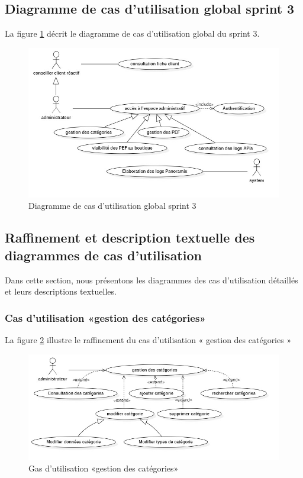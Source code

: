 \subsection{Diagramme de cas d’utilisation global sprint 3}
La figure \ref{fig:usecase-sprint3} décrit le diagramme de cas d’utilisation global du sprint 3.
\begin{figure}[H]
	\centering
	\includegraphics[width=0.58\linewidth]{"img/conception/usecases/sprint 3/UseCase-sprint3"}
	\caption[Diagramme de cas d’utilisation global sprint 3]{Diagramme de cas d’utilisation global sprint 3}
	\label{fig:usecase-sprint3}
\end{figure}

\subsection{Raffinement et description textuelle des diagrammes de cas d’utilisation}
Dans cette section, nous présentons les diagrammes des cas d’utilisation détaillés et leurs descriptions textuelles.
\subsubsection{Cas d’utilisation «gestion des catégories»}
La figure \ref{fig:usecase-gestion-categories} illustre le raffinement du cas d’utilisation « gestion des catégories »

\begin{figure}[H]
	\centering
	\includegraphics[width=0.7\linewidth]{"img/conception/usecases/sprint 3/usecase-gestion-categories"}
	\caption[Cas d’utilisation «gestion des catégories»]{Gas d’utilisation «gestion des catégories»}
	\label{fig:usecase-gestion-categories}
\end{figure}

